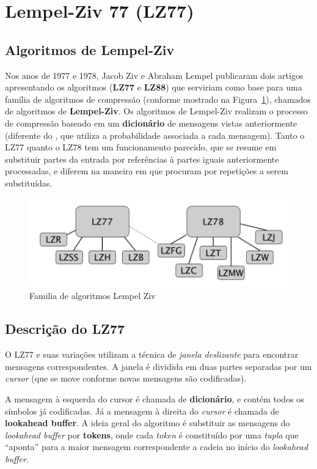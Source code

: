 \section{Lempel-Ziv 77 (LZ77)}

\subsection{Algoritmos de Lempel-Ziv}
Nos anos de 1977 e 1978, Jacob Ziv e Abraham Lempel publicaram dois artigos apresentando os algoritmos (\textbf{LZ77} e \textbf{LZ88}) que serviriam como base para uma família de algoritmos de compressão (conforme mostrado na Figura~\ref{fig:lz77}), chamados de algoritmos de \textbf{Lempel-Ziv}.
Os algoritmos de Lempel-Ziv realizam o processo de compressão baseado em um \textbf{dicionário} de mensagens vistas anteriormente (diferente do , que utiliza a probabilidade associada a cada mensagem). 
Tanto o LZ77 quanto o LZ78 tem um funcionamento parecido, que se resume em substituir partes da entrada por referências à partes iguais anteriormente processadas, e diferem na maneira em que procuram por repetições a serem substituídas. 

\begin{figure}[h]
   \centering
   \includegraphics[scale=0.75]{figs/lz77fam.png}
    \caption{Familia de algoritmos Lempel Ziv}
    \label{fig:lz77}
 \end{figure}

\subsection{Descrição do LZ77}
O LZ77 e suas variações utilizam a técnica de \emph{janela deslizante} para encontrar mensagens correspondentes. 
A janela é dividida em duas partes separadas por um \emph{cursor} (que se move conforme novas mensagens são codificadas).

A mensagem à esquerda do cursor é chamada de \textbf{dicionário}, e contém todos os símbolos já codificadas. Já a mensagem à direita do \emph{cursor} é chamada de \textbf{lookahead buffer}.
A ideia geral do algoritmo é substituir as mensagens do \emph{lookahead buffer} por \textbf{tokens}, onde cada \emph{token} é constituído por uma \emph{tupla} que ``aponta'' para a maior mensagem correspondente a cadeia no início do \emph{lookahead buffer}.

